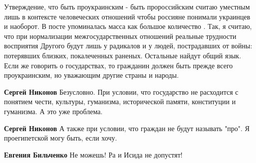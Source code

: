 \begin{itemize}
 

Утверждение, что быть проукраинским - быть пророссийским считаю уместным лишь в
контексте человеческих отношений чтобы россияне понимали украинцев и наоборот.
В посте упоминалась масса как большое количество . Так, я считаю, что при
нормализации межгосударственных отношений реальные трудности восприятия Другого
будут лишь у радикалов и у людей, пострадавших от войны: потерявших близких,
покалеченных раненых. Остальные найдут общий язык. Если же говорить о
государствах, то гражданин должен быть прежде всего проукраинским, но уважающим
другие страны и народы.

\begin{itemize}
 
\textbf{Сергей Никонов} Безусловно. При условии, что государство не расходится с понятием чести, культуры, гуманизма, исторической памяти, конституции и гуманизма. А это уже проблема.

 
\textbf{Сергей Никонов} А также при условии, что граждан не будут называть "про". Я проегипетской могу быть, если хочу.

 
\textbf{Евгения Бильченко} Не можешь! Ра и Исида не допустят!

 

\end{itemize}
\end{itemize}
